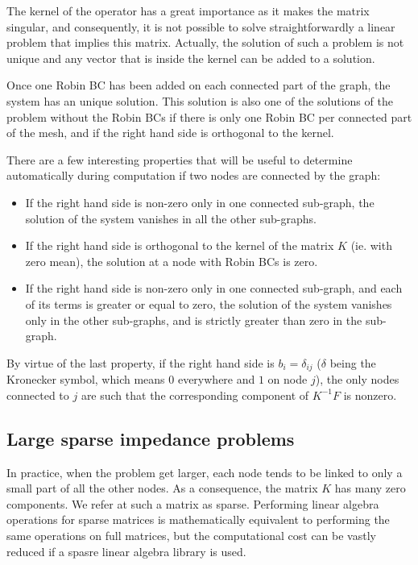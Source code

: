 \documentclass[11pt,a4paper]{article}		%
\begin{document}
The kernel of the operator has a great importance as it makes the matrix singular, and consequently, it is not possible to solve straightforwardly a linear problem that implies this matrix. Actually, the solution of such a problem is not unique and any vector that is inside the kernel can be added to a solution.

Once one Robin BC has been added on each connected part of the graph, the system has an unique solution. This solution is also one of the solutions of the problem without the Robin BCs if there is only one Robin BC per connected part of the mesh, and if the right hand side is orthogonal to the kernel.

There are a few interesting properties that will be useful to determine automatically during computation if two nodes are connected by the graph: 

\begin{itemize}
	\item If the right hand side is non-zero only in one connected sub-graph, the solution of the system vanishes in all the other sub-graphs.
	\item If the right hand side is orthogonal to the kernel of the matrix $K$ (ie. with zero mean), the solution at a node with Robin BCs is zero.
	\item If the right hand side is non-zero only in one connected sub-graph, and each of its terms is greater or equal to zero, the solution of the system vanishes only in the other sub-graphs, and is strictly greater than zero in the sub-graph.
\end{itemize}

By virtue of the last property, if the right hand side is $b_i = \delta_{ij}$ ($\delta$ being the Kronecker symbol, which means $0$ everywhere and $1$ on node $j$), the only nodes connected to $j$ are such that the corresponding component of $K^{-1}F$ is nonzero.

\subsection{Large sparse impedance problems}

In practice, when the problem get larger, each node tends to be linked to only a small part of all the other nodes. As a consequence, the matrix $K$ has many zero components. We refer at such a matrix as sparse. Performing linear algebra operations for sparse matrices is mathematically equivalent to performing the same operations on full matrices, but the computational cost can be vastly reduced if a spasre linear algebra library is used.
\end{document}
